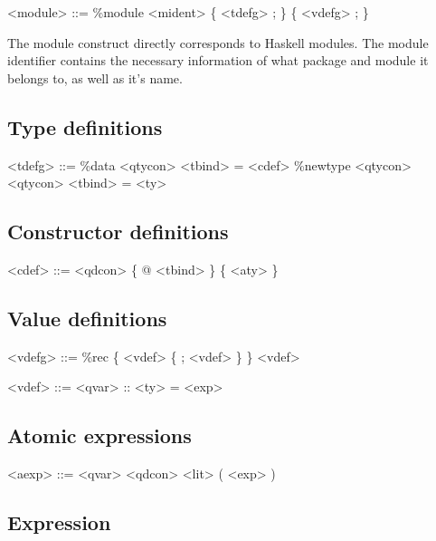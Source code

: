 \begin{grammar}
<module> ::= \%module <mident> \{ <tdefg> ; \} \{ <vdefg> ; \}
\end{grammar}

The module construct directly corresponds to Haskell modules. The module identifier
contains the necessary information of what package and module it belongs to, as
well as it's name.

\subsection{Type definitions}

\begin{grammar}
<tdefg> ::= \%data <qtycon> <tbind> = <cdef>
       \alt \%newtype <qtycon> <qtycon> <tbind> = <ty>
\end{grammar}


\subsection{Constructor definitions}

\begin{grammar}
<cdef> ::= <qdcon> \{ @ <tbind> \} \{ <aty> \}
\end{grammar}

\subsection{Value definitions}

\begin{grammar}
<vdefg> ::= \%rec \{ <vdef> \{ ; <vdef> \} \}
       \alt <vdef>
\end{grammar}

\begin{grammar}
<vdef> ::= <qvar> :: <ty> = <exp>
\end{grammar}

\subsection{Atomic expressions}

\begin{grammar}
<aexp> ::= <qvar>
      \alt <qdcon>
      \alt <lit>
      \alt ( <exp> )
\end{grammar}

\subsection{Expression}

